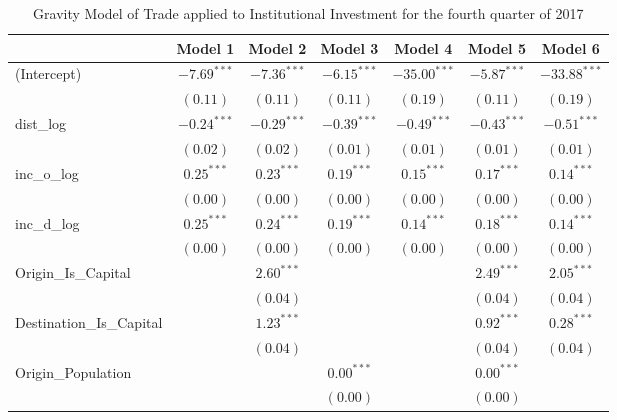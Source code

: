 \begin{table}
	\begin{center}
		\small
		\caption[Gravity Model of trade for Q4 2017]{Gravity Model of Trade applied to Institutional Investment for the fourth quarter of 2017}
		\begin{tabular}{l c c c c c c }
			\hline
			& Model 1 & Model 2 & Model 3 & Model 4 & Model 5 & Model 6 \\
			\hline
			(Intercept)                  & $-7.69^{***}$ & $-7.36^{***}$ & $-6.15^{***}$ & $-35.00^{***}$ & $-5.87^{***}$ & $-33.88^{***}$ \\
			& $(0.11)$      & $(0.11)$      & $(0.11)$      & $(0.19)$       & $(0.11)$      & $(0.19)$       \\
			dist\_log                    & $-0.24^{***}$ & $-0.29^{***}$ & $-0.39^{***}$ & $-0.49^{***}$  & $-0.43^{***}$ & $-0.51^{***}$  \\
			& $(0.02)$      & $(0.02)$      & $(0.01)$      & $(0.01)$       & $(0.01)$      & $(0.01)$       \\
			inc\_o\_log                  & $0.25^{***}$  & $0.23^{***}$  & $0.19^{***}$  & $0.15^{***}$   & $0.17^{***}$  & $0.14^{***}$   \\
			& $(0.00)$      & $(0.00)$      & $(0.00)$      & $(0.00)$       & $(0.00)$      & $(0.00)$       \\
			inc\_d\_log                  & $0.25^{***}$  & $0.24^{***}$  & $0.19^{***}$  & $0.14^{***}$   & $0.18^{***}$  & $0.14^{***}$   \\
			& $(0.00)$      & $(0.00)$      & $(0.00)$      & $(0.00)$       & $(0.00)$      & $(0.00)$       \\
			Origin\_Is\_Capital          &               & $2.60^{***}$  &               &                & $2.49^{***}$  & $2.05^{***}$   \\
			&               & $(0.04)$      &               &                & $(0.04)$      & $(0.04)$       \\
			Destination\_Is\_Capital     &               & $1.23^{***}$  &               &                & $0.92^{***}$  & $0.28^{***}$   \\
			&               & $(0.04)$      &               &                & $(0.04)$      & $(0.04)$       \\
			Origin\_Population           &               &               & $0.00^{***}$  &                & $0.00^{***}$  &                \\
			&               &               & $(0.00)$      &                & $(0.00)$      &                \\

\end{tabular}
\end{center}
\end{table}
